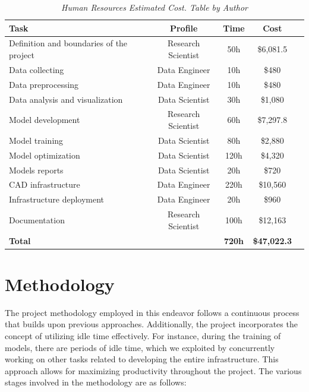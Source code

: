 \newpage

\begin{table}[H]
\centering
\begin{tabular}{lcccc}
	 \toprule
\textbf{Task} & \textbf{Profile} & \textbf{Time} & \textbf{Cost} \\
		\midrule
    Definition and boundaries of the project & Research Scientist & 50h & \$6,081.5\\
    Data collecting & Data Engineer & 10h & \$480\\
    Data preprocessing & Data Engineer & 10h & \$480 \\
    Data analysis and visualization & Data Scientist & 30h & \$1,080\\
    Model development & Research Scientist & 60h & \$7,297.8 \\
    Model training & Data Scientist & 80h & \$2,880 \\
    Model optimization & Data Scientist & 120h & \$4,320 \\
    Models reports & Data Scientist & 20h & \$720 \\
    CAD infrastructure & Data Engineer & 220h & \$10,560 \\
    Infrastructure deployment & Data Engineer & 20h & \$960 \\
    Documentation & Research Scientist & 100h & \$12,163 \\
		\midrule
    \textbf{Total} &    &  \textbf{720h} & \textbf{\$47,022.3} \\
    \bottomrule
\end{tabular}
\caption[Human Resources Estimated Cost.]
  {\textit{Human Resources Estimated Cost. Table by Author}}
{\label{table:human_resources_cost}}
\end{table}


\section{Methodology}

The project methodology employed in this endeavor
follows a continuous process that builds upon previous approaches.
Additionally, the project incorporates the concept of utilizing idle time effectively.
For instance, during the training of models, there are periods of idle time, which we exploited by
concurrently working on other tasks related to developing the entire infrastructure.
This approach allows for maximizing productivity throughout the project.
The various stages involved in the methodology are as follows: \\

